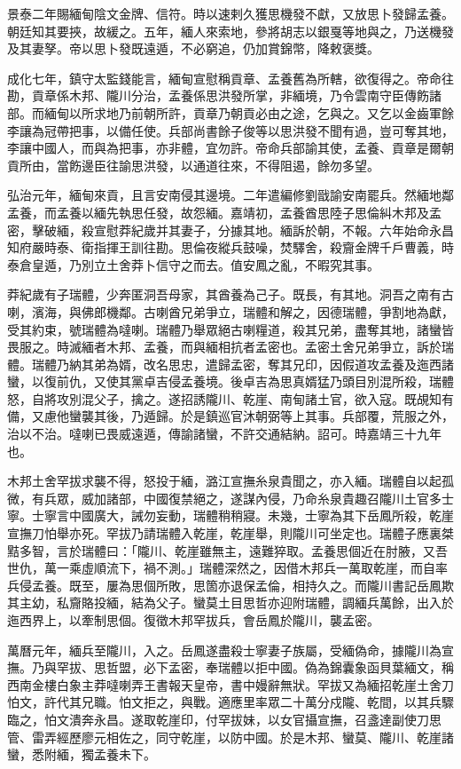 \begin{pinyinscope}
景泰二年賜緬甸陰文金牌、信符。時以速剌久獲思機發不獻，又放思卜發歸孟養。朝廷知其要挾，故緩之。五年，緬人來索地，參將胡志以銀戛等地與之，乃送機發及其妻孥。帝以思卜發既遠遁，不必窮追，仍加賞錦幣，降敕褒獎。

成化七年，鎮守太監錢能言，緬甸宣慰稱貢章、孟養舊為所轄，欲復得之。帝命往勘，貢章係木邦、隴川分治，孟養係思洪發所掌，非緬境，乃令雲南守臣傳飭諸部。而緬甸以所求地乃前朝所許，貢章乃朝貢必由之途，乞與之。又乞以金齒軍餘李讓為冠帶把事，以備任使。兵部尚書餘子俊等以思洪發不聞有過，豈可奪其地，李讓中國人，而與為把事，亦非體，宜勿許。帝命兵部諭其使，孟養、貢章是爾朝貢所由，當飭邊臣往諭思洪發，以通道往來，不得阻遏，餘勿多望。

弘治元年，緬甸來貢，且言安南侵其邊境。二年遣編修劉戩諭安南罷兵。然緬地鄰孟養，而孟養以緬先執思任發，故怨緬。嘉靖初，孟養酋思陸子思倫糾木邦及孟密，擊破緬，殺宣慰莽紀歲并其妻子，分據其地。緬訴於朝，不報。六年始命永昌知府嚴時泰、衛指揮王訓往勘。思倫夜縱兵鼓噪，焚驛舍，殺齎金牌千戶曹義，時泰倉皇遁，乃別立土舍莽卜信守之而去。值安鳳之亂，不暇究其事。

莽紀歲有子瑞體，少奔匿洞吾母家，其酋養為己子。既長，有其地。洞吾之南有古喇，濱海，與佛郎機鄰。古喇酋兄弟爭立，瑞體和解之，因德瑞體，爭割地為獻，受其約束，號瑞體為噠喇。瑞體乃舉眾絕古喇糧道，殺其兄弟，盡奪其地，諸蠻皆畏服之。時滅緬者木邦、孟養，而與緬相抗者孟密也。孟密土舍兄弟爭立，訴於瑞體。瑞體乃納其弟為婿，改名思忠，遣歸孟密，奪其兄印，因假道攻孟養及迤西諸蠻，以復前仇，又使其黨卓吉侵孟養境。後卓吉為思真婿猛乃頭目別混所殺，瑞體怒，自將攻別混父子，擒之。遂招誘隴川、乾崖、南甸諸土官，欲入寇。既覘知有備，又慮他蠻襲其後，乃遁歸。於是鎮巡官沐朝弼等上其事。兵部覆，荒服之外，治以不治。噠喇已畏威遠遁，傳諭諸蠻，不許交通結納。詔可。時嘉靖三十九年也。

木邦土舍罕拔求襲不得，怒投于緬，潞江宣撫糸泉貴聞之，亦入緬。瑞體自以起孤微，有兵眾，威加諸部，中國復禁絕之，遂謀內侵，乃命糸泉貴趣召隴川土官多士寧。士寧言中國廣大，誡勿妄動，瑞體稍稍寢。未幾，士寧為其下岳鳳所殺，乾崖宣撫刀怕舉亦死。罕拔乃請瑞體入乾崖，乾崖舉，則隴川可坐定也。瑞體子應裏桀黠多智，言於瑞體曰：「隴川、乾崖雖無主，遠難猝取。孟養思個近在肘腋，又吾世仇，萬一乘虛順流下，禍不測。」瑞體深然之，因借木邦兵一萬取乾崖，而自率兵侵孟養。既至，屢為思個所敗，思箇亦退保孟倫，相持久之。而隴川書記岳鳳欺其主幼，私齎賂投緬，結為父子。蠻莫土目思哲亦迎附瑞體，調緬兵萬餘，出入於迤西界上，以牽制思個。復徵木邦罕拔兵，會岳鳳於隴川，襲孟密。

萬曆元年，緬兵至隴川，入之。岳鳳遂盡殺士寧妻子族屬，受緬偽命，據隴川為宣撫。乃與罕拔、思哲盟，必下孟密，奉瑞體以拒中國。偽為錦囊象函貝葉緬文，稱西南金樓白象主莽噠喇弄王書報天皇帝，書中嫚辭無狀。罕拔又為緬招乾崖土舍刀怕文，許代其兄職。怕文拒之，與戰。適應里率眾二十萬分戍隴、乾間，以其兵驟臨之，怕文潰奔永昌。遂取乾崖印，付罕拔妹，以女官攝宣撫，召盞達副使刀思管、雷弄經歷廖元相佐之，同守乾崖，以防中國。於是木邦、蠻莫、隴川、乾崖諸蠻，悉附緬，獨孟養未下。


\end{pinyinscope}
